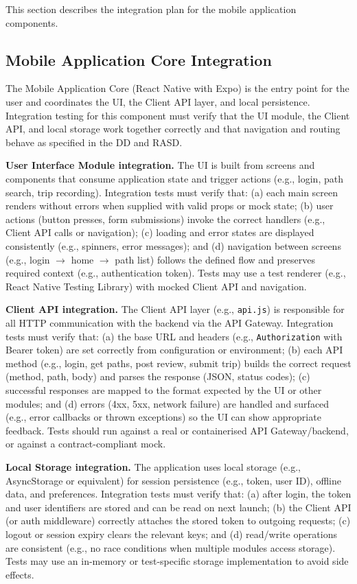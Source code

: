 This section describes the integration plan for the mobile application components.

\subsection{Mobile Application Core Integration}
\label{subsec:mobile_application_core_integration}%

The Mobile Application Core (React Native with Expo) is the entry point for the user and coordinates the UI, the Client API layer, and local persistence. Integration testing for this component must verify that the UI module, the Client API, and local storage work together correctly and that navigation and routing behave as specified in the DD and RASD.

\textbf{User Interface Module integration.}
The UI is built from screens and components that consume application state and trigger actions (e.g., login, path search, trip recording). Integration tests must verify that: (a) each main screen renders without errors when supplied with valid props or mock state; (b) user actions (button presses, form submissions) invoke the correct handlers (e.g., Client API calls or navigation); (c) loading and error states are displayed consistently (e.g., spinners, error messages); and (d) navigation between screens (e.g., login $\to$ home $\to$ path list) follows the defined flow and preserves required context (e.g., authentication token). Tests may use a test renderer (e.g., React Native Testing Library) with mocked Client API and navigation.

\textbf{Client API integration.}
The Client API layer (e.g., \texttt{api.js}) is responsible for all HTTP communication with the backend via the API Gateway. Integration tests must verify that: (a) the base URL and headers (e.g., \texttt{Authorization} with Bearer token) are set correctly from configuration or environment; (b) each API method (e.g., login, get paths, post review, submit trip) builds the correct request (method, path, body) and parses the response (JSON, status codes); (c) successful responses are mapped to the format expected by the UI or other modules; and (d) errors (4xx, 5xx, network failure) are handled and surfaced (e.g., error callbacks or thrown exceptions) so the UI can show appropriate feedback. Tests should run against a real or containerised API Gateway/backend, or against a contract-compliant mock.

\textbf{Local Storage integration.}
The application uses local storage (e.g., AsyncStorage or equivalent) for session persistence (e.g., token, user ID), offline data, and preferences. Integration tests must verify that: (a) after login, the token and user identifiers are stored and can be read on next launch; (b) the Client API (or auth middleware) correctly attaches the stored token to outgoing requests; (c) logout or session expiry clears the relevant keys; and (d) read/write operations are consistent (e.g., no race conditions when multiple modules access storage). Tests may use an in-memory or test-specific storage implementation to avoid side effects.

